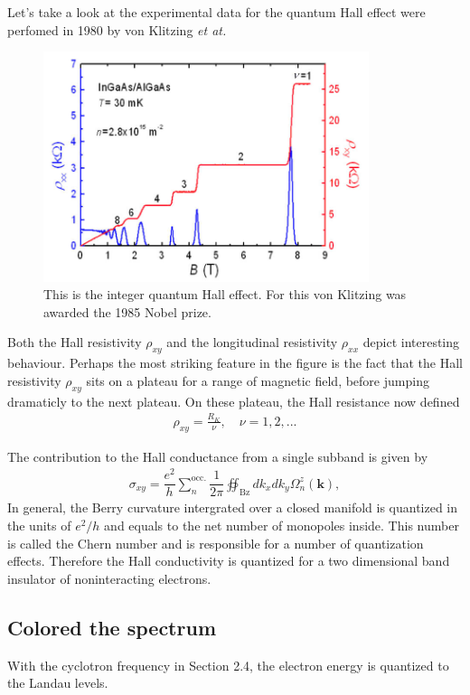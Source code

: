 \documentclass{report}
\newcommand{\f}[2]{\dfrac{#1}{#2}}
\begin{document}
Let's take a look at the experimental data for the quantum Hall effect were perfomed in 1980 by von Klitzing \textit{et at.} \cite{klitzing90}
\begin{figure}[H]
	\centering
	\includegraphics[width=0.85\textwidth,height=0.45\linewidth]{pic/quantumhall.jpg}
	\caption{This is the integer quantum Hall effect. For this von Klitzing was awarded the 1985 Nobel prize.}
\end{figure}
\noindent Both the Hall resistivity $\rho_{xy}$ and the longitudinal resistivity $\rho_{xx}$ depict interesting behaviour. Perhaps the most striking feature in the figure is the fact that the Hall resistivity $\rho_{xy}$ sits on a plateau for a range of magnetic field, before jumping dramaticly to the next plateau. On these plateau, the Hall resistance now defined
\begin{gather}
	\rho_{xy} = \frac{R_{K}}{\nu}, \quad \nu = 1,2,...
\end{gather}

The contribution to the Hall conductance from a single subband is given by \cite{kohmoto1989,hatsugai1990energy,kohmoto1985topological,thouless1982}
\begin{gather}
	\sigma_{xy} = \f{e^{2}}{h} \sum_{n}^{\text{occ.}} \f{1}{2\pi} \oiint_{\text{Bz}} d k_{x} d k_{y} \Omega_{n}^{z} (\mathbf{k}),
\end{gather}
In general, the Berry curvature intergrated over a closed manifold is quantized in the units of $e^{2} / h$ and equals to the net number of monopoles inside. This number is called the Chern number and is responsible for a number of quantization effects. Therefore the Hall conductivity is quantized for a two dimensional band insulator of noninteracting electrons.
\subsection{Colored the spectrum}
With the cyclotron frequency in Section 2.4, the electron energy is quantized to the Landau levels.
\end{document}
